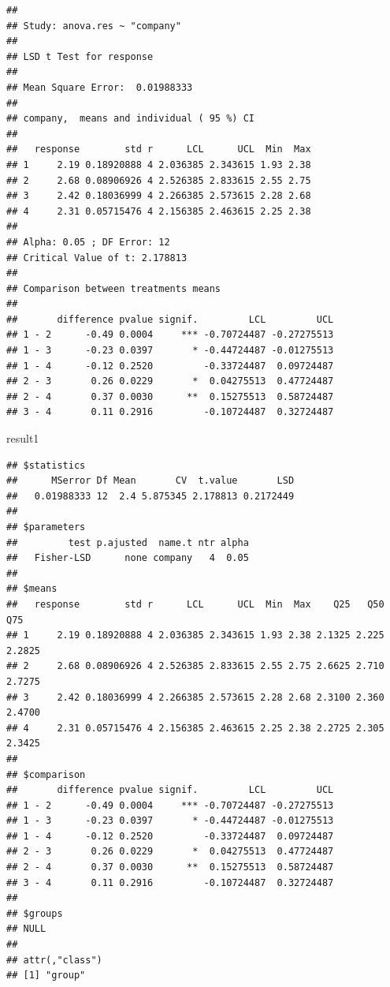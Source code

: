 \documentclass[
]{book}
\newenvironment{Shaded}{\begin{snugshade}}{\end{snugshade}}
\newcommand{\NormalTok}[1]{#1}
\begin{document}
\begin{verbatim}
## 
## Study: anova.res ~ "company"
## 
## LSD t Test for response 
## 
## Mean Square Error:  0.01988333 
## 
## company,  means and individual ( 95 %) CI
## 
##   response        std r      LCL      UCL  Min  Max
## 1     2.19 0.18920888 4 2.036385 2.343615 1.93 2.38
## 2     2.68 0.08906926 4 2.526385 2.833615 2.55 2.75
## 3     2.42 0.18036999 4 2.266385 2.573615 2.28 2.68
## 4     2.31 0.05715476 4 2.156385 2.463615 2.25 2.38
## 
## Alpha: 0.05 ; DF Error: 12
## Critical Value of t: 2.178813 
## 
## Comparison between treatments means
## 
##       difference pvalue signif.         LCL         UCL
## 1 - 2      -0.49 0.0004     *** -0.70724487 -0.27275513
## 1 - 3      -0.23 0.0397       * -0.44724487 -0.01275513
## 1 - 4      -0.12 0.2520         -0.33724487  0.09724487
## 2 - 3       0.26 0.0229       *  0.04275513  0.47724487
## 2 - 4       0.37 0.0030      **  0.15275513  0.58724487
## 3 - 4       0.11 0.2916         -0.10724487  0.32724487
\end{verbatim}

\begin{Shaded}
\begin{Highlighting}[]
\NormalTok{result1}
\end{Highlighting}
\end{Shaded}

\begin{verbatim}
## $statistics
##      MSerror Df Mean       CV  t.value       LSD
##   0.01988333 12  2.4 5.875345 2.178813 0.2172449
## 
## $parameters
##         test p.ajusted  name.t ntr alpha
##   Fisher-LSD      none company   4  0.05
## 
## $means
##   response        std r      LCL      UCL  Min  Max    Q25   Q50    Q75
## 1     2.19 0.18920888 4 2.036385 2.343615 1.93 2.38 2.1325 2.225 2.2825
## 2     2.68 0.08906926 4 2.526385 2.833615 2.55 2.75 2.6625 2.710 2.7275
## 3     2.42 0.18036999 4 2.266385 2.573615 2.28 2.68 2.3100 2.360 2.4700
## 4     2.31 0.05715476 4 2.156385 2.463615 2.25 2.38 2.2725 2.305 2.3425
## 
## $comparison
##       difference pvalue signif.         LCL         UCL
## 1 - 2      -0.49 0.0004     *** -0.70724487 -0.27275513
## 1 - 3      -0.23 0.0397       * -0.44724487 -0.01275513
## 1 - 4      -0.12 0.2520         -0.33724487  0.09724487
## 2 - 3       0.26 0.0229       *  0.04275513  0.47724487
## 2 - 4       0.37 0.0030      **  0.15275513  0.58724487
## 3 - 4       0.11 0.2916         -0.10724487  0.32724487
## 
## $groups
## NULL
## 
## attr(,"class")
## [1] "group"
\end{verbatim}
\end{document}
